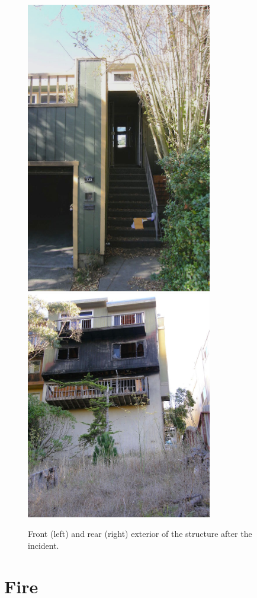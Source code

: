 \documentclass[12pt,oneside]{book}
\begin{document}
\begin{figure}[!ht]
\includegraphics[width=3.20in]{../Figures/post_exterior_front}
\hfill
\includegraphics[width=3.20in]{../Figures/post_exterior_rear}
\caption{Front (left) and rear (right) exterior of the structure after the incident.}
\label{fig:post_exterior}
\end{figure}

\section{Fire}
\label{sec:fire}
\end{document}
